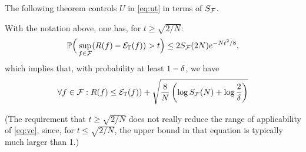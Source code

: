 The following theorem controls $U$ in \cref{eq:ut} in terms of $S_{\mathcal F}$.
\begin{theorem}[Vapnik]
\label{th:vc}
With the notation above, one has, for $t \geq \sqrt{2/N}$: 
\begin{equation}
\label{eq:vc}
\bm{\mathbb P}\Big(\sup_{f\in{\mathcal F}} (R(f) - {\mathcal E}_{\mathbb T}(f)) > t\Big) \leq 2 S_{\mathcal F}(2N) e^{-Nt^2/8},
\end{equation}
which implies that, with probability at least $1-\delta$, we have
\begin{equation}
\label{eq:vc.delta}
\forall f \in{\mathcal F}: R(f) \leq  {\mathcal E}_{\mathbb T}(f)) + \sqrt{\frac8N\left(\log S_{\mathcal F}(N) + \log \frac2{\delta}\right)}
\end{equation} 
\end{theorem}
(The requirement that $t \geq\sqrt{2/N}$ does not really reduce the range of applicability of \cref{eq:vc}, since, for $t\leq \sqrt{2/N}$,  the upper bound in that equation is typically much larger than 1.)
